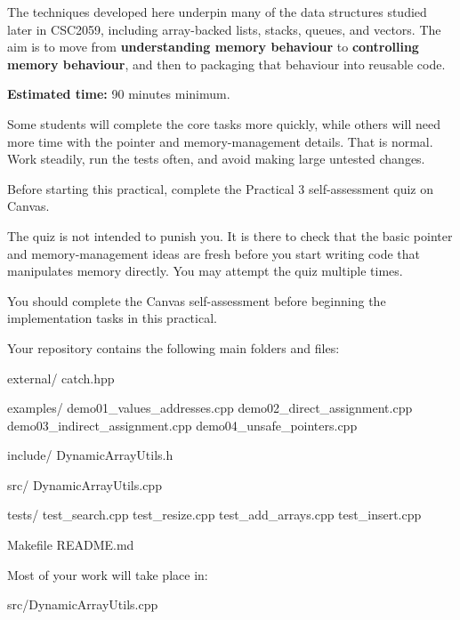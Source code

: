 \documentclass{csc2059practical}
\begin{document}
The techniques developed here underpin many of the data structures studied later in CSC2059, including array-backed lists, stacks, queues, and vectors. The aim is to move from \textbf{understanding memory behaviour} to \textbf{controlling memory behaviour}, and then to packaging that behaviour into reusable code.

\begin{infobox}
\textbf{Estimated time:} 90 minutes minimum.

Some students will complete the core tasks more quickly, while others will need more time with the pointer and memory-management details. That is normal. Work steadily, run the tests often, and avoid making large untested changes.
\end{infobox}


Before starting this practical, complete the Practical 3 self-assessment quiz on Canvas.

The quiz is not intended to punish you. It is there to check that the basic pointer and memory-management ideas are fresh before you start writing code that manipulates memory directly. You may attempt the quiz multiple times.

\begin{importantnote}
You should complete the Canvas self-assessment before beginning the implementation tasks in this practical.
\end{importantnote}


Your repository contains the following main folders and files:

\begin{terminal}
external/
    catch.hpp

examples/
    demo01_values_addresses.cpp
    demo02_direct_assignment.cpp
    demo03_indirect_assignment.cpp
    demo04_unsafe_pointers.cpp

include/
    DynamicArrayUtils.h

src/
    DynamicArrayUtils.cpp

tests/
    test_search.cpp
    test_resize.cpp
    test_add_arrays.cpp
    test_insert.cpp

Makefile
README.md
\end{terminal}

Most of your work will take place in:

\begin{terminal}
src/DynamicArrayUtils.cpp
\end{terminal}
\end{document}
